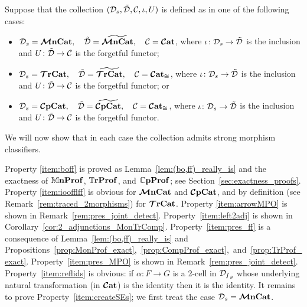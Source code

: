 \documentclass[11pt,oneside,article]{memoir}
\begin{document}
\begin{example}
    \label{ex:strictifiable}
  Suppose that the collection $(\mathcal{D}_s,\tilde{\mathcal{D}},\mathcal{C},\iota,U)$ is defined as in one of the
  following cases:
  \begin{itemize}
    \item $\mathcal{D}_s=\bm{\mathcal{M}}\mathbf{nCat}, \quad \tilde{\mathcal{D}}=\widetilde{\bm{\mathcal{M}}\mathbf{nCat}}, \quad \mathcal{C}=\bm{\mathcal{C}}\mathbf{at}$, where
      $\iota\colon\mathcal{D}_s\to\tilde{\mathcal{D}}$ is the inclusion and $U\colon\tilde{\mathcal{D}}\to\mathcal{C}$ is the
      forgetful functor;
    \item $\mathcal{D}_s=\bm{\mathcal{T}}\mathbf{rCat}, \quad \tilde{\mathcal{D}}=\widetilde{\bm{\mathcal{T}}\mathbf{rCat}}, \quad \mathcal{C}=\bm{\mathcal{C}}\mathbf{at}_{\cong}$, where
      $\iota\colon\mathcal{D}_s\to\tilde{\mathcal{D}}$ is the inclusion and $U\colon\tilde{\mathcal{D}}\to\mathcal{C}$ is the
      forgetful functor; or
    \item $\mathcal{D}_s=\bm{\mathcal{C}}\mathbf{pCat}, \quad \tilde{\mathcal{D}}=\widetilde{\bm{\mathcal{C}}\mathbf{pCat}}, \quad \mathcal{C}=\bm{\mathcal{C}}\mathbf{at}_{\cong}$, where
      $\iota\colon\mathcal{D}_s\to\tilde{\mathcal{D}}$ is the inclusion and $U\colon\tilde{\mathcal{D}}\to\mathcal{C}$ is the
      forgetful functor.
  \end{itemize}
  We will now show that in each case the collection admits strong morphism classifiers.

  Property \ref{item:boff} is proved as Lemma~\ref{lem:(bo,ff)_really_is} and the exactness of
  $\mathbb{M}\mathbf{nProf}$, $\mathbb{T}\mathbf{rProf}$, and $\mathbb{C}\mathbf{pProf}$; see Section~\ref{sec:exactness_proofs}. Property
  \ref{item:ioofflff} is obvious for $\bm{\mathcal{M}}\mathbf{nCat}$ and $\bm{\mathcal{C}}\mathbf{pCat}$, and by definition (see
  Remark~\ref{rem:traced_2morphisms}) for $\bm{\mathcal{T}}\mathbf{rCat}$. Property \ref{item:arrowMPO} is shown in
  Remark~\ref{rem:pres_joint_detect}. Property~\ref{item:left2adj} is shown in
  Corollary~\ref{cor:2_adjunctions_MonTrComp}. Property~\ref{item:pres_ff} is a consequence of
  Lemma~\ref{lem:(bo,ff)_really_is} and
  Propositions~\ref{prop:MonProf_exact},~\ref{prop:CompProf_exact},~and~\ref{prop:TrProf_exact}.
  Property~\ref{item:pres_MPO} is shown in Remark~\ref{rem:pres_joint_detect}.
  Property~\ref{item:reflids} is obvious: if $\alpha\colon F\to G$ is a 2-cell in $\mathcal{D_s}_s$ whose
  underlying natural transformation (in $\bm{\mathcal{C}}\mathbf{at}$) is the identity then it is the identity. It remains
  to prove Property~\ref{item:createSEs}; we first treat the case $\mathcal{D}_s=\bm{\mathcal{M}}\mathbf{nCat}$.


\end{example}
\end{document}
